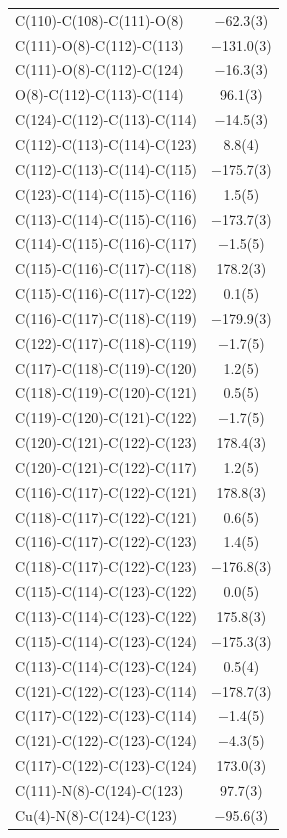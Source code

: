\begin{center}
{\begin{supertabular}{p{1.8in}c}
C(110)-C(108)-C(111)-O(8)&$-$62.3(3)\\
C(111)-O(8)-C(112)-C(113)&$-$131.0(3)\\
C(111)-O(8)-C(112)-C(124)&$-$16.3(3)\\
O(8)-C(112)-C(113)-C(114)&96.1(3)\\
C(124)-C(112)-C(113)-C(114)&$-$14.5(3)\\
C(112)-C(113)-C(114)-C(123)&8.8(4)\\
C(112)-C(113)-C(114)-C(115)&$-$175.7(3)\\
C(123)-C(114)-C(115)-C(116)&1.5(5)\\
C(113)-C(114)-C(115)-C(116)&$-$173.7(3)\\
C(114)-C(115)-C(116)-C(117)&$-$1.5(5)\\
C(115)-C(116)-C(117)-C(118)&178.2(3)\\
C(115)-C(116)-C(117)-C(122)&0.1(5)\\
C(116)-C(117)-C(118)-C(119)&$-$179.9(3)\\
C(122)-C(117)-C(118)-C(119)&$-$1.7(5)\\
C(117)-C(118)-C(119)-C(120)&1.2(5)\\
C(118)-C(119)-C(120)-C(121)&0.5(5)\\
C(119)-C(120)-C(121)-C(122)&$-$1.7(5)\\
C(120)-C(121)-C(122)-C(123)&178.4(3)\\
C(120)-C(121)-C(122)-C(117)&1.2(5)\\
C(116)-C(117)-C(122)-C(121)&178.8(3)\\
C(118)-C(117)-C(122)-C(121)&0.6(5)\\
C(116)-C(117)-C(122)-C(123)&1.4(5)\\
C(118)-C(117)-C(122)-C(123)&$-$176.8(3)\\
C(115)-C(114)-C(123)-C(122)&0.0(5)\\
C(113)-C(114)-C(123)-C(122)&175.8(3)\\
C(115)-C(114)-C(123)-C(124)&$-$175.3(3)\\
C(113)-C(114)-C(123)-C(124)&0.5(4)\\
C(121)-C(122)-C(123)-C(114)&$-$178.7(3)\\
C(117)-C(122)-C(123)-C(114)&$-$1.4(5)\\
C(121)-C(122)-C(123)-C(124)&$-$4.3(5)\\
C(117)-C(122)-C(123)-C(124)&173.0(3)\\
C(111)-N(8)-C(124)-C(123)&97.7(3)\\
Cu(4)-N(8)-C(124)-C(123)&$-$95.6(3)\\

\end{supertabular}}
\end{center}
